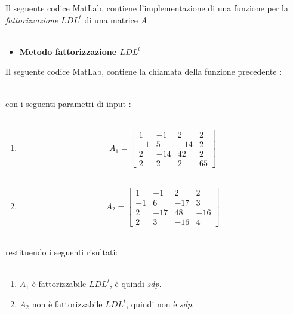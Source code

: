 Il seguente codice MatLab, contiene l'implementazione di una funzione per la \textit{fattorizzazione} $LDL^t$ di una matrice \textit{A}\\\
\begin{itemize}
\item \textbf{Metodo fattorizzazione $LDL^t$}

\end{itemize}
Il seguente codice MatLab, contiene la chiamata della funzione precedente :\\\

con i seguenti parametri di input :\\\
\begin{enumerate}
\item
\[
A_1 =\begin{bmatrix}
	1  & -1  & 2   & 2  \\ 
	-1 & 5   & -14 & 2  \\
	2  & -14 & 42  & 2  \\
	2  & 2   & 2   & 65 
\end{bmatrix}
\]\\
\item
\[
A_2 =\begin{bmatrix}
	1  & -1  & 2   & 2   \\ 
	-1 & 6   & -17 & 3   \\
	2  & -17 & 48  & -16 \\
	2  & 3   & -16 & 4   
\end{bmatrix}
\]\\
\end{enumerate}
restituendo i seguenti risultati:\\\
\begin{enumerate}
\item
$A_1$ è fattorizzabile $LDL^t$, è quindi \textit{sdp}.
\item
$A_2$ non è fattorizzabile $LDL^t$, quindi non è \textit{sdp}.
\end{enumerate}